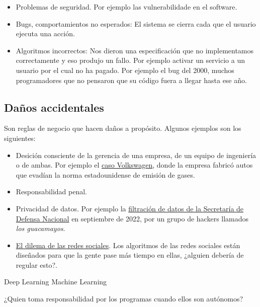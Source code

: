 \documentclass[twoside]{article}
\begin{document}
\begin{multicols}{2}
\begin{itemize}
\item Problemas de seguridad. Por ejemplo las vulnerabilidade en el software.
\item Bugs, comportamientos no esperados: El sistema se cierra cada que el
usuario ejecuta una acción.
\item Algoritmos incorrectos: Nos dieron una especificación que no implementamos
correctamente y eso produjo un fallo. Por ejemplo activar un servicio a un
usuario por el cual no ha pagado. Por ejemplo el bug del 2000, muchos
programadores que no pensaron que su código fuera a llegar hasta ese año.
\end{itemize}

\subsection{Daños accidentales}

Son reglas de negocio que hacen daños a propósito. Algunos ejemplos son los
siguientes:

\begin{itemize}
\item Desición consciente de la gerencia de una empresa, de un equipo de
ingeniería o de ambas. Por ejemplo el
\href{https://repositorio.comillas.edu/rest/bitstreams/295635/retrieve}{caso
Volkswagen}, donde la empresa fabricó autos que evadían la norma estadounidense
de emisión de gases.
\item Responsabilidad penal.
\item Privacidad de datos. Por ejemplo la
\href{https://elpais.com/mexico/2022-10-01/una-masiva-filtracion-expone-el-poder-del-ejercito-mexicano-en-la-vida-publica.html}{filtración
de datos de la Secretaría de Defensa Nacional} en septiembre de 2022, por un
grupo de hackers llamados \textit{los guacamayos}.
\item
\href{https://www.netflix.com/es/title/81254224#:~:text=Este%20documental%20dramatizado%20analiza%20la,las%20herramientas%20creadas%20por%20ellos.&text=Ve%20todo%20lo%20que%20quieras.&text=De%20Jeff%20Orlowski%2C%20director%20del,'%2C%20ganador%20del%20premio%20Emmy.}
{El dilema de las redes sociales}. Los algoritmos de las redes sociales
están diseñados para que la gente pase más tiempo en ellas, ¿alguien debería de
regular esto?.
\end{itemize}


Deep Learning
Machine Learning

¿Quien toma responsabilidad por los programas cuando ellos son autónomos?


\end{multicols}
\end{document}
